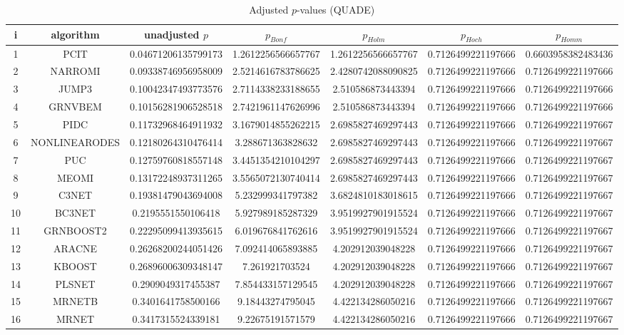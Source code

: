 \documentclass[a4paper,10pt]{article}
\begin{document}
\begin{landscape}
\begin{table}[!htp]
\centering\scriptsize
\caption{Adjusted $p$-values (QUADE)}
\begin{tabular}{ccccccc}
i&algorithm&unadjusted $p$&$p_{Bonf}$&$p_{Holm}$&$p_{Hoch}$&$p_{Homm}$\\
\hline
1&PCIT&0.04671206135799173&1.2612256566657767&1.2612256566657767&0.7126499221197666&0.6603958382483436\\
2&NARROMI&0.09338746956958009&2.5214616783786625&2.4280742088090825&0.7126499221197666&0.7126499221197666\\
3&JUMP3&0.10042347493773576&2.7114338233188655&2.510586873443394&0.7126499221197666&0.7126499221197666\\
4&GRNVBEM&0.10156281906528518&2.7421961147626996&2.510586873443394&0.7126499221197666&0.7126499221197666\\
5&PIDC&0.11732968464911932&3.1679014855262215&2.6985827469297443&0.7126499221197666&0.7126499221197667\\
6&NONLINEARODES&0.12180264310476414&3.288671363828632&2.6985827469297443&0.7126499221197666&0.7126499221197667\\
7&PUC&0.12759760818557148&3.4451354210104297&2.6985827469297443&0.7126499221197666&0.7126499221197667\\
8&MEOMI&0.13172248937311265&3.5565072130740414&2.6985827469297443&0.7126499221197666&0.7126499221197667\\
9&C3NET&0.19381479043694008&5.232999341797382&3.6824810183018615&0.7126499221197666&0.7126499221197667\\
10&BC3NET&0.2195551550106418&5.927989185287329&3.9519927901915524&0.7126499221197666&0.7126499221197667\\
11&GRNBOOST2&0.22295099413935615&6.019676841762616&3.9519927901915524&0.7126499221197666&0.7126499221197667\\
12&ARACNE&0.26268200244051426&7.092414065893885&4.202912039048228&0.7126499221197666&0.7126499221197667\\
13&KBOOST&0.26896006309348147&7.261921703524&4.202912039048228&0.7126499221197666&0.7126499221197667\\
14&PLSNET&0.2909049317455387&7.854433157129545&4.202912039048228&0.7126499221197666&0.7126499221197667\\
15&MRNETB&0.3401641758500166&9.18443274795045&4.422134286050216&0.7126499221197666&0.7126499221197667\\
16&MRNET&0.3417315524339181&9.22675191571579&4.422134286050216&0.7126499221197666&0.7126499221197667\\

\end{tabular}
\end{table}
\end{landscape}
\end{document}

